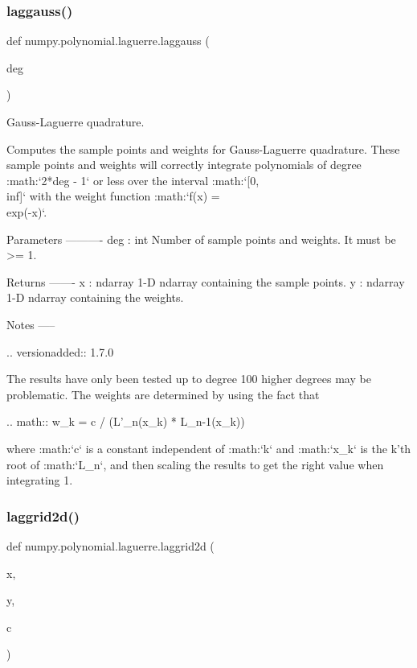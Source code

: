 \subsubsection{\texorpdfstring{laggauss()}{laggauss()}}
{\footnotesize\ttfamily def numpy.\+polynomial.\+laguerre.\+laggauss (\begin{DoxyParamCaption}\item[{}]{deg }\end{DoxyParamCaption})}

\begin{DoxyVerb}Gauss-Laguerre quadrature.

Computes the sample points and weights for Gauss-Laguerre quadrature.
These sample points and weights will correctly integrate polynomials of
degree :math:`2*deg - 1` or less over the interval :math:`[0, \\inf]`
with the weight function :math:`f(x) = \\exp(-x)`.

Parameters
----------
deg : int
    Number of sample points and weights. It must be >= 1.

Returns
-------
x : ndarray
    1-D ndarray containing the sample points.
y : ndarray
    1-D ndarray containing the weights.

Notes
-----

.. versionadded:: 1.7.0

The results have only been tested up to degree 100 higher degrees may
be problematic. The weights are determined by using the fact that

.. math:: w_k = c / (L'_n(x_k) * L_{n-1}(x_k))

where :math:`c` is a constant independent of :math:`k` and :math:`x_k`
is the k'th root of :math:`L_n`, and then scaling the results to get
the right value when integrating 1.\end{DoxyVerb}
 \mbox{\label{namespacenumpy_1_1polynomial_1_1laguerre_aa1e2a402a9654a8ee372c7a9ab7191aa}} 
\subsubsection{\texorpdfstring{laggrid2d()}{laggrid2d()}}
{\footnotesize\ttfamily def numpy.\+polynomial.\+laguerre.\+laggrid2d (\begin{DoxyParamCaption}\item[{}]{x,  }\item[{}]{y,  }\item[{}]{c }\end{DoxyParamCaption})}

